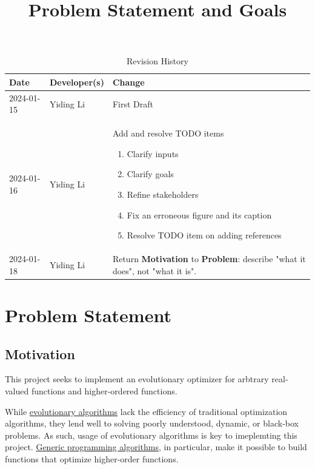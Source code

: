\documentclass{article}
\title{Problem Statement and Goals\\\progname}
\author{\authname}
\date{}
\begin{document}
\maketitle

\begin{table}[hp]
\caption{Revision History} \label{TblRevisionHistory}
\begin{tabularx}{\textwidth}{llX}
\toprule
\textbf{Date} & \textbf{Developer(s)} & \textbf{Change}\\
\midrule
2024-01-15 & Yiding Li & First Draft\\
2024-01-16 & Yiding Li & Add and resolve TODO items
\begin{enumerate}
    \item Clarify inputs
    \item Clarify goals
    \item Refine stakeholders
    \item Fix an erroneous figure and its caption
    \item Resolve TODO item on adding references
\end{enumerate}
\\
2024-01-18 & Yiding Li & Return \textbf{Motivation} to \textbf{Problem}: describe "what it does", not "what it is".\\
\bottomrule
\end{tabularx}
\end{table}

\section{Problem Statement}


\subsection{Motivation}

This project seeks to implement an evolutionary optimizer for arbtrary real-valued functions and higher-ordered functions.

While \hyperref[sec:evalg]{evolutionary algorithms} lack the efficiency of traditional optimization algorithms, they lend well to solving poorly understood, dynamic, or black-box problems. As such, usage of evolutionary algorithms is key to imeplemting this project. \hyperref[sec:genalg]{Generic programming algorithms}, in particular, make it possible to build functions that optimize higher-order functions.
\end{document}
